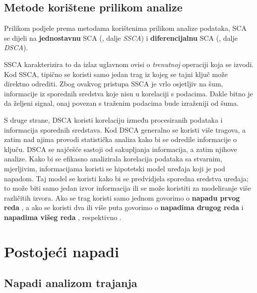 \documentclass[times, utf8, diplomski]{fer}
\begin{document}
\subsection{Metode korištene prilikom analize}

Prilikom podjele prema metodama korištenima prilikom analize podataka, SCA se dijeli na \textbf{jednostavnu} SCA (, dalje \emph{SSCA}) i \textbf{diferencijalnu} SCA (, dalje \emph{DSCA}).

SSCA karakterizira to da izlaz uglavnom ovisi o \emph{trenutnoj} operaciji koja se izvodi. Kod SSCA, tipično se koristi samo jedan trag  iz kojeg se tajni ključ može direktno odrediti. Zbog ovakvog pristupa SSCA je vrlo osjetljiv na šum, informacije iz sporednih sredstva koje nisu u korelaciji s podacima. Dakle bitno je da željeni signal, onaj povezan s traženim podacima bude izraženiji od šuma.

S druge strane, DSCA koristi korelaciju između procesiranih podataka i informacija sporednih sredstava. Kod DSCA generalno se koristi više tragova, a zatim nad njima provodi statistička analiza kako bi se odredile informacije o ključu. DSCA se najčešće sastoji od sakupljanja informacija, a zatim njihove analize. Kako bi se efikasno analizirala korelacija podataka sa stvarnim, mjerljivim, informacijama koristi se hipotetski model uređaja koji je pod napadom. Taj model se koristi kako bi se predvidjela sporedna sredstva uređaja; to može biti samo jedan izvor informacija ili se može koristiti za modeliranje više različitih izvora. Ako se trag koristi samo jednom govorimo o \textbf{napadu prvog reda} , a ako se koristi dva ili više puta govorimo o \textbf{napadima drugog reda}  i \textbf{napadima višeg reda} , respektivno \citep{zhou2005side}.

\section{Postojeći napadi} \label{sec:known_attacks}

\subsection{Napadi analizom trajanja}
\end{document}
